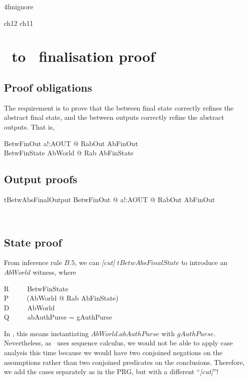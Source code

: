 \ai4fmignore{
\begin{zsection}
  \SECTION ch12 \parents ch11
\end{zsection}
}
\chapter{\Abs\ to \Betw\ finalisation proof}\label{ch12}

\section{Proof obligations}

The requirement is to prove that the between final state correctly
refines the abstract final state, and the between outputs correctly
refine the abstract outputs.  That is,
\begin{gzed}
  BetwFinOut
  \shows \exists a!:AOUT @ RabOut \land AbFinOut
\\
  BetwFinState
  \shows \exists AbWorld @ Rab \land AbFinState
\end{gzed}

\section{Output proofs}\label{ch12.out}

\begin{LThm}%
\begin{theorem}{tBetwAbsFinalOutput}
\forall BetwFinOut @ \exists a!:AOUT @ RabOut \land AbFinOut
\end{theorem}~\end{LThm}

\section{State proof}\label{ch12.state}

From inference rule $B.5$, we can \textit{[cut]} $tBetwAbsFinalState$
to introduce an $AbWorld$ witness, where
%
\begin{gzed}
    R  ~~~~  BetwFinState \\
    P  ~~~~  (\exists AbWorld @ Rab \land AbFinState) \\
    D  ~~~~  AbWorld \\
    Q  ~~~~  abAuthPurse = gAuthPurse
\end{gzed}

In \zeves, this means instantiating $AbWorld.abAuthPurse$ with $gAuthPurse$.
Nevertheless, as \zeves\ uses sequence calculus, we would not be able to apply
case analysis this time because we would have two conjoined negations on the
assumptions rather than two conjoined predicates on the conclusions.
Therefore, we add the cases separately as in the PRG, but with a different
``\textit{[cut]}''!

